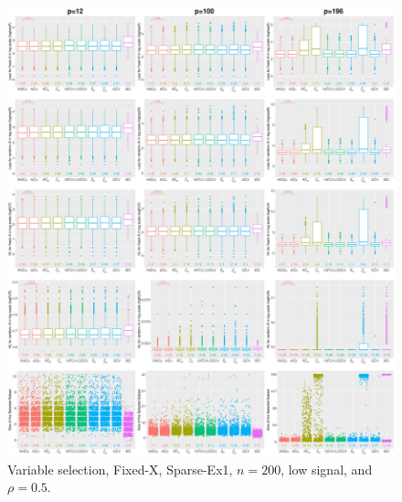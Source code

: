 \begin{figure}[!ht]
\centering
\includegraphics[width=\textwidth]{figures/supplement/fixedx/subset_selection/Sparse-Ex1_n200_lsnr_rho05.eps}
\caption{Variable selection, Fixed-X, Sparse-Ex1, $n=200$, low signal, and $\rho=0.5$.}
\end{figure}
\clearpage
